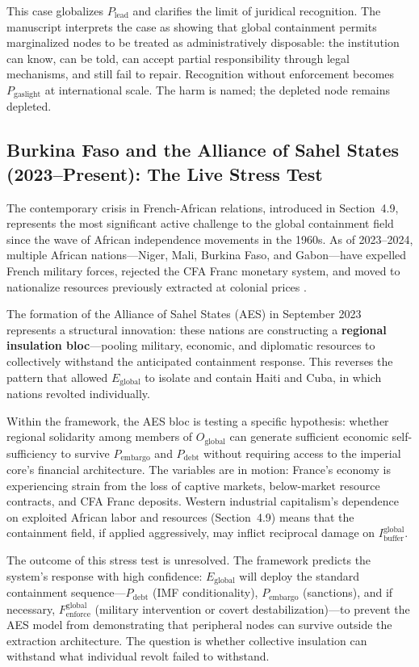 This case globalizes $P_{\text{lead}}$ and clarifies the limit of juridical recognition. The manuscript interprets the case as showing that global containment permits marginalized nodes to be treated as administratively disposable: the institution can know, can be told, can accept partial responsibility through legal mechanisms, and still fail to repair. Recognition without enforcement becomes $P_{\text{gaslight}}$ at international scale. The harm is named; the depleted node remains depleted.

\subsection{Burkina Faso and the Alliance of Sahel States (2023--Present): The Live Stress Test}

The contemporary crisis in French-African relations, introduced in Section~4.9, represents the most significant active challenge to the global containment field since the wave of African independence movements in the 1960s. As of 2023--2024, multiple African nations---Niger, Mali, Burkina Faso, and Gabon---have expelled French military forces, rejected the CFA Franc monetary system, and moved to nationalize resources previously extracted at colonial prices \cite{pigeaud}.

The formation of the Alliance of Sahel States (AES) in September 2023 represents a structural innovation: these nations are constructing a \textbf{regional insulation bloc}---pooling military, economic, and diplomatic resources to collectively withstand the anticipated containment response. This reverses the pattern that allowed $E_{\text{global}}$ to isolate and contain Haiti and Cuba, in which nations revolted individually.

Within the framework, the AES bloc is testing a specific hypothesis: whether regional solidarity among members of $O_{\text{global}}$ can generate sufficient economic self-sufficiency to survive $P_{\text{embargo}}$ and $P_{\text{debt}}$ without requiring access to the imperial core's financial architecture. The variables are in motion: France's economy is experiencing strain from the loss of captive markets, below-market resource contracts, and CFA Franc deposits. Western industrial capitalism's dependence on exploited African labor and resources (Section~4.9) means that the containment field, if applied aggressively, may inflict reciprocal damage on $I_{\text{buffer}}^{\text{global}}$.

The outcome of this stress test is unresolved. The framework predicts the system's response with high confidence: $E_{\text{global}}$ will deploy the standard containment sequence---$P_{\text{debt}}$ (IMF conditionality), $P_{\text{embargo}}$ (sanctions), and if necessary, $F_{\text{enforce}}^{\text{global}}$ (military intervention or covert destabilization)---to prevent the AES model from demonstrating that peripheral nodes can survive outside the extraction architecture. The question is whether collective insulation can withstand what individual revolt failed to withstand.

